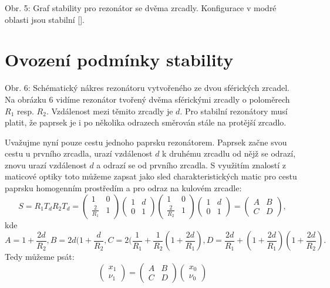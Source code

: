 \documentclass[a4paper,12pt]{article}
\begin{document}
Obr. 5: Graf stability pro rezonátor se dvěma zrcadly. Konfigurace v modré oblasti jsou stabilní [\cite{cavity}].
\section{Ovození podmínky stability}
Obr. 6: Schématický nákres rezonátoru vytvořeného ze dvou sférických zrcadel.
Na obrázku 6 vidíme rezonátor tvořený dvěma sférickými zrcadly o poloměrech $R_1$ resp. $R_2$. Vzdálenost mezi těmito zrcadly je $d$. Pro stabilní rezonátory musí platit, že paprsek je i po několika odrazech směrován stále na protější zrcadlo.

Uvažujme nyní pouze cestu jednoho paprsku rezonátorem. Paprsek začne svou cestu u prvního zrcadla, urazí vzdálenost $d$ k druhému zrcadlu od nějž se odrazí, znovu urazí vzdálenost $d$ a odrazí se od prvního zrcadla. S využitím znalostí z maticové optiky toto můžeme zapsat jako sled charakteristických matic pro cestu paprsku homogenním prostředím a pro odraz na kulovém zrcadle:
$$
S = R_1T_dR_2T_d = 
\begin{pmatrix}
1 & 0 \\
\frac{2}{R_1} & 1
\end{pmatrix}\begin{pmatrix}
1 & d \\
0 & 1
\end{pmatrix}\begin{pmatrix}
1 & 0 \\
\frac{2}{R_2} & 1
\end{pmatrix}\begin{pmatrix}
1 & d \\
0 & 1
\end{pmatrix} = \begin{pmatrix}
A & B\\
C & D
\end{pmatrix},$$ kde
$$
A=1+\frac{2d}{R_2},
B=2d(1+\frac{d}{R_2},
C=2(\frac{1}{R_1} + \frac{1}{R_2}(1+\frac{2d}{R_1}),
D=\frac{2d}{R_1} + (1 + \frac{2d}{R_1})(1+\frac{2d}{R_2}).
$$
Tedy můžeme psát:
$$
\begin{pmatrix}
x_1 \\
\nu_1
\end{pmatrix} = \begin{pmatrix}
A & B\\
C & D
\end{pmatrix}\begin{pmatrix}
x_0 \\
\nu_0
\end{pmatrix}
$$
\end{document}
